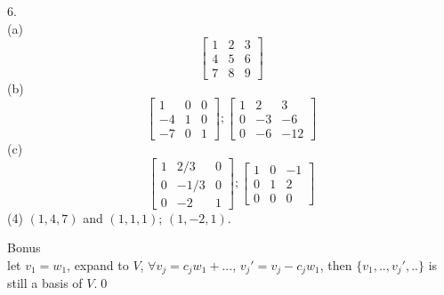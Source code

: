 \documentclass[paper=a4, fontsize=11pt]{scrartcl} %
\numberwithin{equation}{section} %
\numberwithin{figure}{section} %
\numberwithin{table}{section} %
\begin{document}
6.\\
(a)\begin{equation}
\begin{bmatrix}
	1 & 2 & 3 \\
	4 & 5 & 6 \\
	7 & 8 & 9
\end{bmatrix}\end{equation}
(b)\begin{equation}
\begin{bmatrix}
	1 & 0 & 0 \\
	-4 & 1 & 0 \\
	-7 & 0 & 1
\end{bmatrix};
\begin{bmatrix}
	1 & 2 & 3 \\
	0 & -3 & -6 \\
	0 & -6 & -12
\end{bmatrix}
\end{equation}
(c)\begin{equation}
\begin{bmatrix}
	1 & 2/3 & 0 \\
	0 & -1/3 & 0 \\
	0 & -2 & 1
\end{bmatrix};
\begin{bmatrix}
	1 & 0 & -1 \\
	0 & 1 & 2 \\
	0 & 0 & 0
\end{bmatrix}\end{equation}
(4) $(1,4,7)$ and $(1,1,1)$; $(1,-2,1)$.

Bonus\\
let $v_1=w_1$, expand to $V$, $\forall v_j= c_jw_1+...$, $v_j'=v_j-c_jw_1$, then $\{v_1,..,v_j',..\}$ is still a basis of $V$.\qed
\end{document}
